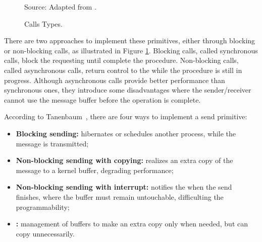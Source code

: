 				\begin{figure}[t]
					\centering
					\caption{Calls Types.}%



					Source: Adapted from \cite{tanenbaum:4ed}.

					\label{fig.calls-types}
				\end{figure}

				There are two approaches to implement these primitives, either
				through blocking or non-blocking calls, as illustrated in Figure \ref{fig.calls-types}.
				Blocking calls, called synchronous calls, block the requesting \cpu
				until complete the procedure.
				Non-blocking calls, called asynchronous calls, return control to the
				\cpu while the procedure is still in progress.
				Although asynchronous calls provide better performance than
				synchronous ones, they introduce some disadvantages where the sender/receiver
				cannot use the message buffer before the operation is complete.

				According to Tanenbaum~\cite{tanenbaum:4ed}, there are four ways to implement a send primitive:
				\begin{itemize}
					\item \textbf{Blocking sending:} \cpu hibernates or schedules another
						process, while the message is transmitted;
					\item \textbf{Non-blocking sending with copying:} realizes an extra copy of
						the message to a kernel buffer, degrading performance;
					\item \textbf{Non-blocking sending with interrupt:} notifies the \cpu
						when the send finishes, where the buffer must remain untouchable,
						difficulting the programmability;
					\item \textbf{\cow:} management of buffers to make an extra copy only
						when needed, but can copy unnecessarily.
				\end{itemize}

